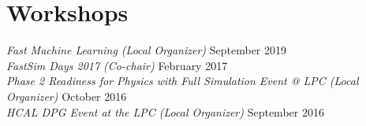 \section{Workshops}
{\sl Fast Machine Learning (Local Organizer)} \hfill September 2019\\
{\sl FastSim Days 2017 (Co-chair)} \hfill February 2017\\
{\sl Phase 2 Readiness for Physics with Full Simulation Event @ LPC (Local Organizer)} \hfill October 2016\\
{\sl HCAL DPG Event at the LPC (Local Organizer)} \hfill September 2016%
